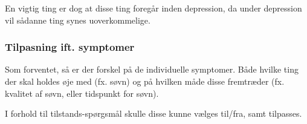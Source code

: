 En vigtig ting er dog at disse ting foregår inden depression, da under depression vil sådanne ting synes uoverkommelige.

\subsubsection{Tilpasning ift. symptomer}
Som forventet, så er der forskel på de individuelle symptomer.
Både hvilke ting der skal holdes øje med (fx. søvn) og på hvilken måde disse fremtræder (fx. kvalitet af søvn, eller tidspunkt for søvn).

I forhold til tilstands-spørgsmål skulle disse kunne vælges til/fra, samt tilpasses.
